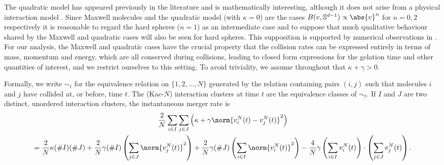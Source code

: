 The quadratic model has appeared previously in the literature \cite{Lu,PSW17} and is mathematically interesting, although it does not arise from a physical interaction model \cite{Villani}.
Since Maxwell molecules and the quadratic model (with $\kappa = 0$) are the cases  $B(v, \mathbb{S}^{d-1}) \propto \abs{v}^n$ for $n=0,2$ respectively it is reasonable to regard the hard spheres ($n=1$) as an intermediate case and to suppose that much qualitative behaviour shared by the Maxwell and quadratic cases will also be seen for hard spheres.
This supposition is supported by numerical observations in \cite{PSW17}.
For our analysis, the Maxwell and quadratic cases have the crucial property that the collision rates can be expressed entirely in terms of mass, momentum and energy, which are all conserved during collisions, leading to closed form expressions for the gelation time and other quantities of interest, and we restrict ourselves to this setting.
To avoid triviality, we assume throughout that $\kappa + \gamma > 0$.


Formally, we write $\sim_t$ for the equivalence relation on $\{1,2,\dotsc, N\}$ generated by the relation containing pairs $(i, j)$ such that molecules $i$ and $j$ have collided at, or before, time $t$. The (Kac-$N$) interaction clusters at time $t$ are the equivalence classes of $\sim_t$.
If $I$ and $J$ are two distinct, unordered interaction clusters, the instantaneous merger rate is
\begin{multline}\label{e:cluster-merge-rate}
    \frac2N\sum_{i\in I}\sum_{j\in J}
     \left(\kappa + \gamma \norm{v_i^N(t) - v_j^N(t)}^2 \right)\\
    =
    \frac2N\kappa (\#I)(\#J)
    +\frac2N\gamma (\#{I})\left( \sum_{j\in J}\norm{v_j^N(t)}^2\right)
    +\frac2N\gamma (\#{J})\left( \sum_{i\in I}\norm{v_i^N(t)}^2\right)
    -\frac4N\gamma \left(\sum_{i\in I}v_i^N(t)\right)\cdot
    \left(\sum_{j\in J}v_j^N(t)\right).
\end{multline}

